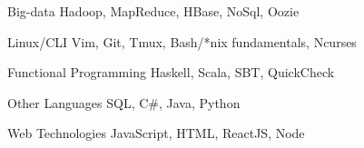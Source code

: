

\begin{cvskills}

  \cvskill
    {Big-data}
    {Hadoop, MapReduce, HBase, NoSql, Oozie}

  \cvskill
    {Linux/CLI}
    {Vim, Git, Tmux, Bash/*nix fundamentals, Ncurses}

  \cvskill
    {Functional Programming}
    {Haskell, Scala, SBT, QuickCheck}

  \cvskill
    {Other Languages}
    {SQL, C\#, Java, Python}

  \cvskill
    {Web Technologies}
    {JavaScript, HTML, ReactJS, Node}

\end{cvskills}
